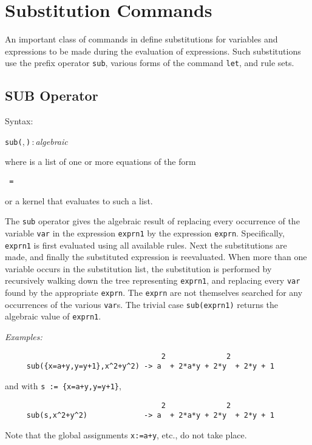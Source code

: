 \chapter{Substitution Commands}

\label{chapter:subst}

An important class of commands in {\REDUCE} define
substitutions for variables and expressions to be made during the
evaluation of expressions.  Such substitutions use the prefix operator
\texttt{sub}, various forms of the command \texttt{let}, and rule sets.

\section{SUB Operator}
\hypertarget{operator:SUB}{}

Syntax:
\begin{syntax}
  \texttt{sub(},\,\texttt{)}\,:\,\textit{algebraic}
\end{syntax}
where  is a list of one or more equations of the
form
\begin{syntax}
  \texttt{ = }
\end{syntax}
or a kernel that evaluates to such a list.

The \texttt{sub} operator gives the algebraic result of replacing every
occurrence of the variable \texttt{var} in the expression \texttt{exprn1} by the
expression \texttt{exprn}.  Specifically, \texttt{exprn1} is first evaluated
using all available rules.  Next the substitutions are made, and finally
the substituted expression is reevaluated.  When more than one variable
occurs in the substitution list, the substitution is performed by
recursively walking down the tree representing \texttt{exprn1}, and replacing
every \texttt{var} found by the appropriate \texttt{exprn}.  The \texttt{exprn} are
not themselves searched for any occurrences of the various \texttt{var}s.
The trivial case \texttt{sub(exprn1)} returns the algebraic value of
\texttt{exprn1}.

\textit{Examples:}
\begin{verbatim}
                                    2              2
     sub({x=a+y,y=y+1},x^2+y^2) -> a  + 2*a*y + 2*y  + 2*y + 1
\end{verbatim}
and with \texttt{s := \{x=a+y,y=y+1\}},
\begin{verbatim}
                                    2              2
     sub(s,x^2+y^2)             -> a  + 2*a*y + 2*y  + 2*y + 1
\end{verbatim}
Note that the global assignments \texttt{x:=a+y}, etc., do not take place.

